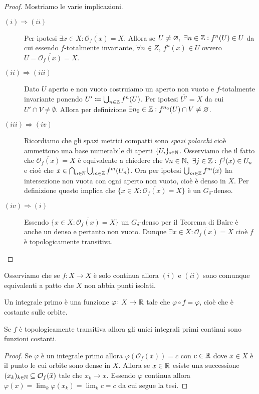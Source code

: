 \begin{proof}
    Mostriamo le varie implicazioni.
	\begin{description}
		\item[$ (i) \Rightarrow (ii) $] Per ipotesi $ \exists x \in X : \overline{\mathcal{O}_f(x)} = X $. Allora se $ U \neq \varnothing, \ \exists n \in \mathbb{Z} : f^{n}(U) \in U $ da cui essendo $ f $-totalmente invariante, $ \forall n \in Z, \ f^n(x) \in U $ ovvero $ \overline{U} = \overline{\mathcal{O}_f(x)} = X $. 
		\item[$ (ii) \Rightarrow (iii) $] Dato $ U $ aperto e non vuoto costruiamo un aperto non vuoto e $ f $-totalmente invariante ponendo $ U' \coloneqq \bigcup_{n \in \mathbb{Z}} f^n(U) $. Per ipotesi $ \overline{U'} = X $ da cui $ U' \cap V \neq \emptyset $. Allora per definizione $ \exists n_0 \in \mathbb{Z} : f^{n_0}(U) \cap V \neq \varnothing $.
		\item[$ (iii) \Rightarrow (iv) $] Ricordiamo che gli spazi metrici compatti sono \emph{spazi polacchi} cioè ammettono una base numerabile di aperti $ \{U_i\}_{i \in \mathbb{N}} $. Osserviamo che il fatto che $ \overline{\mathcal{O}_f(x)} = X $ è equivalente a chiedere che $ \forall n \in \mathbb{N}, \ \exists j \in \mathbb{Z} : f^j(x) \in U_n $ e cioè che $ x \in \bigcap_{n \in \mathbb{N}} \bigcup_{m \in \mathbb{Z}} f^{m}(U_n) $. Ora per ipotesi $ \bigcup_{m \in \mathbb{Z}} f^m(x) $ ha intersezione non vuota con ogni aperto non vuoto, cioè è denso in $ X $. Per definizione questo implica che $ \{x \in X : \overline{\mathcal{O}_f(x)} = X\} $ è un $ G_\delta $-denso. 
		\item[$ (iv) \Rightarrow (i) $] Essendo $ \{x \in X : \overline{\mathcal{O}_f(x)} = X\} $ un $ G_\delta $-denso per il Teorema di Ba\^{i}re è anche un denso e pertanto non vuoto. Dunque $ \exists x \in X : \overline{\mathcal{O}_f(x)} = X $ cioè $ f $ è topologicamente transitiva. \qedhere
	\end{description}
\end{proof}

Osserviamo che se $ f \colon X \to X $ è solo continua allora $ (i) $ e $ (ii) $ sono comunque equivalenti a patto che $ X $ non abbia punti isolati. \\

\begin{definition}
	Un integrale primo è una funzione $ \varphi \colon X \to \mathbb{R} $ tale che $ \varphi \circ f = \varphi $, cioè che è costante sulle orbite. 
\end{definition}

\begin{proposition}
	Se $ f $ è topologicamente transitiva allora gli unici integrali primi continui sono funzioni costanti.
\end{proposition}
%
\begin{proof}
	Se $ \varphi $ è un integrale primo allora $ \varphi(\mathcal{O}_f(\bar{x})) = c $ con $ c \in \mathbb{R} $ dove $ \bar{x} \in X $ è il punto le cui orbite sono dense in $ X $. Allora se $ x \in \mathbb{R} $ esiste una successione $ (x_k)_{k \in \mathbb{N}} \subseteq \mathcal{O}_f(\bar{x}) $ tale che $ x_k \to x $. Essendo $ \varphi $ continua allora $ \varphi(x) = \lim_{k} \varphi(x_k) = \lim_{k} c = c $ da cui segue la tesi. 
\end{proof}

